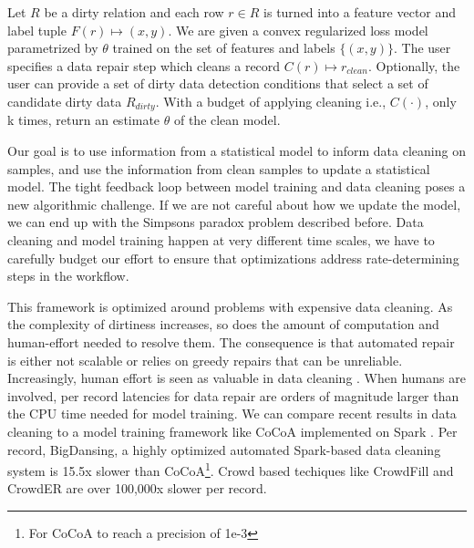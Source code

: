 \begin{problem}\label{activeclean}\sloppy
Let $R$ be a dirty relation and each row $r \in R$ is 
turned into a feature vector and label tuple $F(r) \mapsto (x,y)$.
We are given a convex regularized loss model parametrized
by $\theta$ trained on the set of features and labels $\{(x,y)\}$.
The user specifies a data repair step which cleans a record 
$C(r) \mapsto r_{clean}$.
Optionally, the user can provide a set of dirty data detection conditions that select 
a set of candidate dirty data $R_{dirty}$.
With a budget of applying cleaning i.e., $C(\cdot)$, only k times, return an estimate $\hat{\theta}$ of the clean model.
\end{problem}

Our goal is to use information from a statistical model to inform data cleaning on samples, and use the information from clean samples to update a statistical model.
The tight feedback loop between model training and data cleaning poses a new algorithmic challenge. 
If we are not careful about how we update the model, we can end up with the Simpsons paradox problem described before.
Data cleaning and model training happen at very different time scales, we have to carefully budget our effort to ensure that optimizations address rate-determining steps in the workflow.

This framework is optimized around problems with expensive data cleaning.
As the complexity of dirtiness increases, so does the amount of computation and human-effort needed to resolve them.
The consequence is that automated repair is either not scalable or relies on greedy repairs that can be unreliable.
Increasingly, human effort is seen as valuable in data cleaning \cite{park2014crowdfill, wang2012crowder, gokhale2014corleone, wang1999sample}.
When humans are involved, per record latencies for data repair are orders of magnitude larger than the CPU time needed for model training.
We can compare recent results in data cleaning to a model training framework like CoCoA implemented on Spark \cite{jaggi2014communication}.
Per record, BigDansing, a highly optimized automated Spark-based data cleaning system is 15.5x slower than CoCoA\footnote{For CoCoA to reach a precision of 1e-3}.
Crowd based techiques like CrowdFill \cite{park2014crowdfill} and CrowdER \cite{wang2012crowder} are over 100,000x slower per record.

